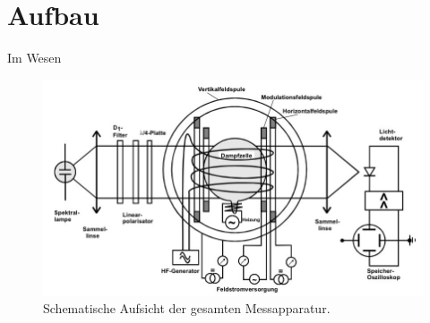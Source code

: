 \section{Aufbau}
\label{sec:Aufbau}

Im Wesen

\begin{figure}[H]
	\centering
	\includegraphics[width=0.8\linewidth]{content/grafik/aufbau.jpg}
	\caption{Schematische Aufsicht der gesamten Messapparatur. \cite{pumpen}}
	\label{fig:aufbau}
\end{figure}
